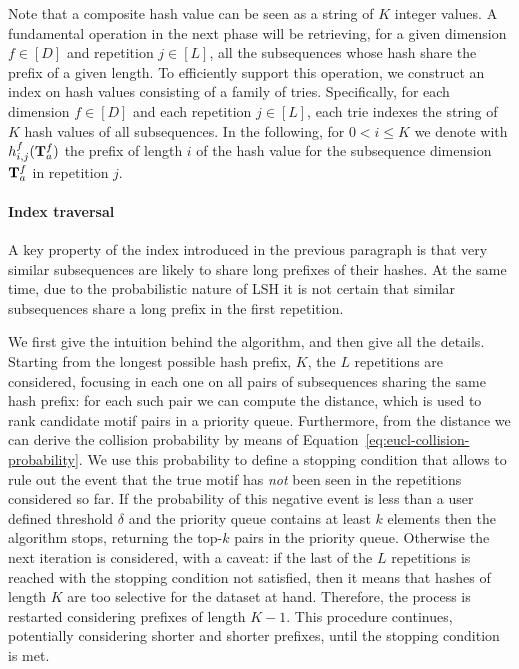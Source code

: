 Note that a composite hash value can be seen as a string of $K$ integer values.
A fundamental operation in the next phase will be retrieving, for a given dimension $f\in[D]$
and repetition $j\in[L]$, all the subsequences whose hash share the prefix of a given length.
To efficiently support this operation, we construct an index on hash values consisting of a family of tries. Specifically, for each dimension $f\in[D]$ and each repetition $j\in[L]$, each trie indexes the string of $K$ hash values of all subsequences.
In the following, for $0 <i \le K$ we denote with $h_{i, j}^f(\mathbf{T}_{a}^{f})$ the prefix
of length $i$ of the hash value for the subsequence dimension $\mathbf{T}_{a}^{f}$ in repetition $j$.


\paragraph{Index traversal}

A key property of the index introduced in the previous paragraph is that very similar subsequences are likely to share long prefixes of their hashes.
At the same time, due to the probabilistic nature of LSH it is not certain that similar
subsequences share a long prefix in the first repetition.

We first give the intuition behind the algorithm, and then give all the details.
Starting from the longest possible hash prefix, $K$, the $L$ repetitions are considered,
focusing in each one on all pairs of subsequences
sharing the same hash prefix: for each such pair we can compute the distance, which is used to rank candidate motif pairs in a priority queue.
Furthermore, from the distance we can derive the collision probability by means of Equation~\eqref{eq:eucl-collision-probability}.
We use this probability to define a stopping condition that allows to rule out the event that the true motif has \emph{not} been seen in the repetitions considered so far.
If the probability of this negative event is less than a user defined threshold $\delta$ and the priority queue contains at least $k$ elements then
the algorithm stops, returning the top-$k$ pairs in the priority queue.
Otherwise the next iteration is considered, with a caveat: if the last of the $L$ repetitions is reached with the stopping condition not satisfied, then it means that hashes of length $K$ are too selective for the dataset at hand. Therefore, the process is restarted considering prefixes of length $K-1$. This procedure continues, potentially considering shorter and shorter prefixes, until the stopping condition is met.

